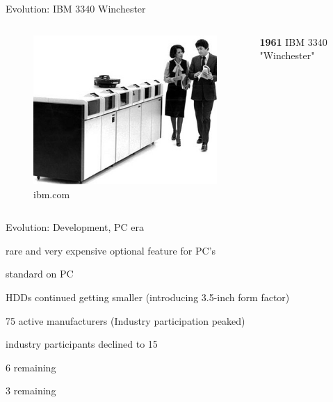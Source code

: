 \documentclass[12pt]{beamer}
\newlength{\wideitemsep}
\let\olditem\item
\renewcommand{\item}{\setlength{\itemsep}{\wideitemsep}\olditem}
\begin{document}
\begin{frame}[fragile]{Evolution: IBM 3340 Winchester}
	\begin{columns}[c]
	\begin{column}[c]{.5\textwidth}	
 		\begin{figure}[c]
	 		\centering
	 		\includegraphics[width=\linewidth]{img/ibm_3340.jpg}
	 			\caption{ibm.com}
 		\end{figure}
 	\end{column}
 	
	\begin{column}[c]{.5\textwidth}
		\textbf{1961} IBM 3340 "Winchester"
	\end{column}
	\end{columns}
\end{frame}

\begin{frame}[fragile]{Evolution: Development, PC era}
	\begin{description}
		\item[early 1980] rare and very expensive optional feature for PC's
		\item[late 1980] standard on PC
		\item[1988] 	HDDs continued getting smaller (introducing 3.5-inch form factor)
		\item[1985] 75 active manufacturers (Industry participation peaked)
		\item[1999] industry participants declined to 15
		\item[2009] 6 remaining
		\item[2012] 3 remaining
	\end{description}
\end{frame}
\end{document}
